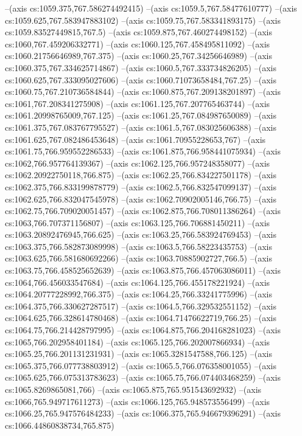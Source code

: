 --(axis cs:1059.375,767.586274492415)
--(axis cs:1059.5,767.58477610777)
--(axis cs:1059.625,767.583947883102)
--(axis cs:1059.75,767.583341893175)
--(axis cs:1059.83527449815,767.5)
--(axis cs:1059.875,767.460274498152)
--(axis cs:1060,767.459206332771)
--(axis cs:1060.125,767.458495811092)
--(axis cs:1060.21756646989,767.375)
--(axis cs:1060.25,767.34256646989)
--(axis cs:1060.375,767.334625714867)
--(axis cs:1060.5,767.333734826205)
--(axis cs:1060.625,767.333095027606)
--(axis cs:1060.71073658484,767.25)
--(axis cs:1060.75,767.210736584844)
--(axis cs:1060.875,767.209138201897)
--(axis cs:1061,767.208341275908)
--(axis cs:1061.125,767.207765463744)
--(axis cs:1061.20998765009,767.125)
--(axis cs:1061.25,767.084987650089)
--(axis cs:1061.375,767.083767795527)
--(axis cs:1061.5,767.083025606388)
--(axis cs:1061.625,767.082486453648)
--(axis cs:1061.70955228653,767)
--(axis cs:1061.75,766.959552286533)
--(axis cs:1061.875,766.958441075934)
--(axis cs:1062,766.957764139367)
--(axis cs:1062.125,766.957248358077)
--(axis cs:1062.20922750118,766.875)
--(axis cs:1062.25,766.834227501178)
--(axis cs:1062.375,766.833199878779)
--(axis cs:1062.5,766.832547099137)
--(axis cs:1062.625,766.832047545978)
--(axis cs:1062.70902005146,766.75)
--(axis cs:1062.75,766.709020051457)
--(axis cs:1062.875,766.708011386264)
--(axis cs:1063,766.707371156807)
--(axis cs:1063.125,766.706881450211)
--(axis cs:1063.20892476945,766.625)
--(axis cs:1063.25,766.583924769453)
--(axis cs:1063.375,766.582873089998)
--(axis cs:1063.5,766.58223435753)
--(axis cs:1063.625,766.581680692266)
--(axis cs:1063.70885902727,766.5)
--(axis cs:1063.75,766.458525652639)
--(axis cs:1063.875,766.457063086011)
--(axis cs:1064,766.456033547684)
--(axis cs:1064.125,766.455178221924)
--(axis cs:1064.20777228992,766.375)
--(axis cs:1064.25,766.33241775996)
--(axis cs:1064.375,766.330627287517)
--(axis cs:1064.5,766.329532551152)
--(axis cs:1064.625,766.328614780468)
--(axis cs:1064.71476622719,766.25)
--(axis cs:1064.75,766.214428797995)
--(axis cs:1064.875,766.204168281023)
--(axis cs:1065,766.202958401184)
--(axis cs:1065.125,766.202007866934)
--(axis cs:1065.25,766.201131231931)
--(axis cs:1065.3281547588,766.125)
--(axis cs:1065.375,766.077738803912)
--(axis cs:1065.5,766.076358001055)
--(axis cs:1065.625,766.075313783623)
--(axis cs:1065.75,766.074403468259)
--(axis cs:1065.8269865081,766)
--(axis cs:1065.875,765.951543692932)
--(axis cs:1066,765.949717611273)
--(axis cs:1066.125,765.948573556499)
--(axis cs:1066.25,765.947576484233)
--(axis cs:1066.375,765.946679396291)
--(axis cs:1066.44860838734,765.875)
